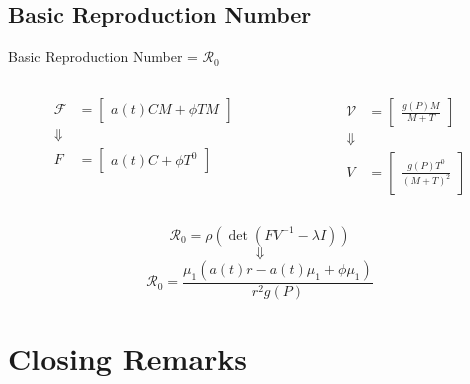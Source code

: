 \documentclass{beamer}
\begin{document}
\subsection{Basic Reproduction Number}
\begin{frame}{Basic Reproduction Number = $\mathscr{R}_{0}$}
    \begin{columns}
        \begin{column}{0.5\textwidth}
            \begin{align*}
                \mathscr{F} &= \begin{bmatrix} a(t)CM+\phi TM \end{bmatrix}\\
                \Downarrow\\
                F &= \begin{bmatrix} a(t)C + \phi T^{0} \end{bmatrix}
            \end{align*}
        \end{column}
        \begin{column}{0.5\textwidth}
            \begin{align*}
                \mathscr{V} &= \begin{bmatrix} \frac{g(P)M}{M+T} \end{bmatrix}\\
                \Downarrow\\
                V &= \begin{bmatrix} \frac{g(P)T^{0}}{(M+T)^{2}} \end{bmatrix}
            \end{align*}
        \end{column}
    \end{columns}
    $$\mathscr{R}_{0} = \rho(\det(FV^{-1} - \lambda I))$$
    $$\Downarrow$$
    $$\displaystyle {\mathscr{R}}_{0} = \frac{\mu_{1}(a(t) r - a(t)\mu_{1} + \phi \mu_{1})}{r^{2}g(P)}$$
\end{frame}



\section{Closing Remarks}
\end{document}
